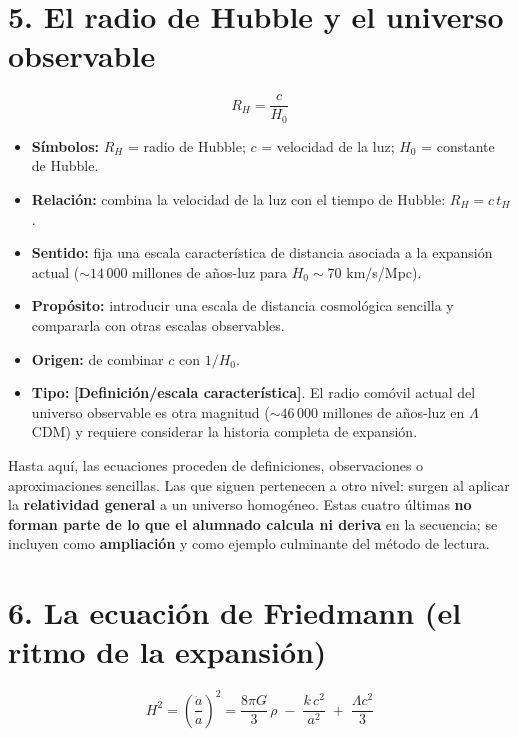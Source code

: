 \section*{5. El radio de Hubble y el universo observable}

\[ R_H = \frac{c}{H_0} \]

\begin{itemize}
  \item \textbf{Símbolos:} $R_H$ = radio de Hubble; $c$ = velocidad de la luz; $H_0$ = constante de Hubble.
  \item \textbf{Relación:} combina la velocidad de la luz con el tiempo de Hubble: $R_H=c\,t_H$.
  \item \textbf{Sentido:} fija una escala característica de distancia asociada a la expansión actual ($\sim14\,000$ millones de años-luz para $H_0\sim70$ km/s/Mpc).
  \item \textbf{Propósito:} introducir una escala de distancia cosmológica sencilla y compararla con otras escalas observables.
  \item \textbf{Origen:} de combinar $c$ con $1/H_0$.
  \item \textbf{Tipo:} \textbf{[Definición/escala característica]}. El radio comóvil actual del universo observable es otra magnitud ($\sim46\,000$ millones de años-luz en $\Lambda$CDM) y requiere considerar la historia completa de expansión.
\end{itemize}

Hasta aquí, las ecuaciones proceden de definiciones, observaciones o aproximaciones sencillas. Las que siguen pertenecen a otro nivel: surgen al aplicar la \textbf{relatividad general} a un universo homogéneo. Estas cuatro últimas \textbf{no forman parte de lo que el alumnado calcula ni deriva} en la secuencia; se incluyen como \textbf{ampliación} y como ejemplo culminante del método de lectura.

\section*{6. La ecuación de Friedmann (el ritmo de la expansión)}

\[ H^{2}=\left(\frac{\dot a}{a}\right)^{2}=\frac{8\pi G}{3}\,\rho\;-\;\frac{k\,c^{2}}{a^{2}}\;+\;\frac{\Lambda c^{2}}{3} \]

